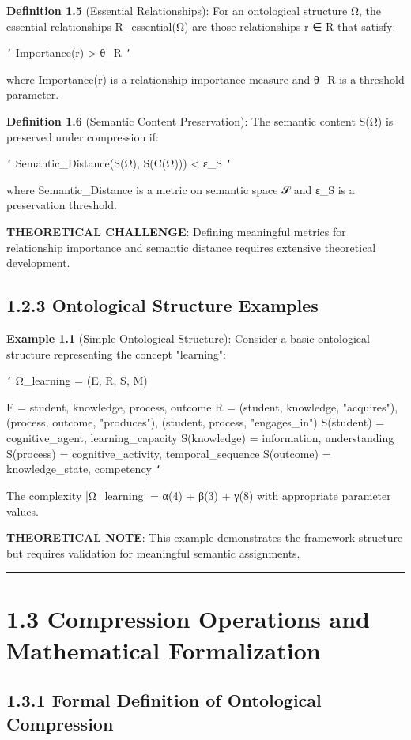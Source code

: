 \textbf{Definition 1.5} (Essential Relationships): For an ontological structure Ω, the essential relationships R_essential(Ω) are those relationships r ∈ R that satisfy:

\texttt{`}
Importance(r) > θ_R
\texttt{`}

where Importance(r) is a relationship importance measure and θ_R is a threshold parameter.

\textbf{Definition 1.6} (Semantic Content Preservation): The semantic content S(Ω) is preserved under compression if:

\texttt{`}
Semantic_Distance(S(Ω), S(C(Ω))) < ε_S
\texttt{`}

where Semantic_Distance is a metric on semantic space 𝒮 and ε_S is a preservation threshold.

\textbf{THEORETICAL CHALLENGE}: Defining meaningful metrics for relationship importance and semantic distance requires extensive theoretical development.

\subsection{1.2.3 Ontological Structure Examples}

\textbf{Example 1.1} (Simple Ontological Structure): Consider a basic ontological structure representing the concept "learning":

\texttt{`}
Ω_learning = (E, R, S, M)

E = {student, knowledge, process, outcome}
R = {(student, knowledge, "acquires"), 
     (process, outcome, "produces"),
     (student, process, "engages_in")}
S(student) = {cognitive_agent, learning_capacity}
S(knowledge) = {information, understanding}
S(process) = {cognitive_activity, temporal_sequence}
S(outcome) = {knowledge_state, competency}
\texttt{`}

The complexity |Ω_learning| = α(4) + β(3) + γ(8) with appropriate parameter values.

\textbf{THEORETICAL NOTE}: This example demonstrates the framework structure but requires validation for meaningful semantic assignments.

\hrule

\section{1.3 Compression Operations and Mathematical Formalization}

\subsection{1.3.1 Formal Definition of Ontological Compression}


